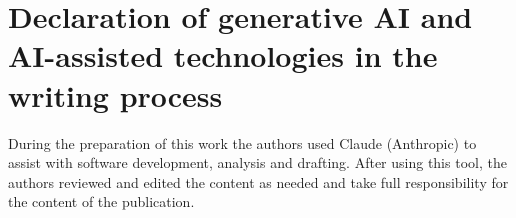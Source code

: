 \documentclass[preprint,12pt,authoryear]{elsarticle}
\begin{document}
\section*{Declaration of generative AI and AI-assisted technologies in the writing process}
During the preparation of this work the authors used Claude (Anthropic) to assist with software
development, analysis and drafting. After using this tool, the authors reviewed and edited the
content as needed and take full responsibility for the content of the publication.



\end{document}
